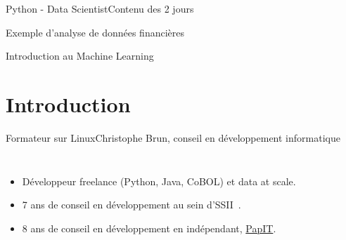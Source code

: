 \documentclass{beamer}
\begin{document}
\begin{frame}{Python - Data Scientist}{Contenu des 2 jours}
\begin{tiny}
\begin{multicols}{3}
\begin{itemize}
{                    \item Exemple d'analyse de données financières

                    \item Introduction au Machine Learning
                }
                \end{itemize}
            \end{multicols}
        \end{tiny}

    \end{frame}


    \section{Introduction}\label{sec:introduction}

    \begin{frame}{Formateur sur Linux}{Christophe Brun, conseil en développement informatique}

        \begin{columns}
            \begin{itemize}
                \item Développeur freelance (Python, Java, CoBOL) et data at scale.

                \item 7 ans de conseil en développement au sein d'SSII~.

                \item 8 ans de conseil en développement en indépendant, \href{https://papit.fr}{PapIT}.


\end{itemize}
\end{columns}
\end{frame}
\end{document}
